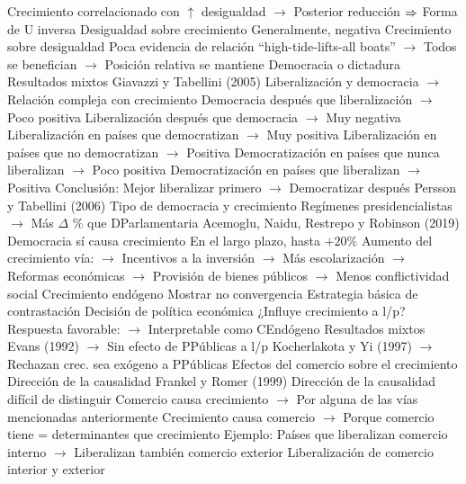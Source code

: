 \documentclass{nuevotema}
\begin{document}
\begin{esquemal}
				\4[] Crecimiento correlacionado con $\uparrow$ desigualdad
				\4[] $\to$ Posterior reducción
				\4[] $\Rightarrow$ Forma de U inversa
				\4 Desigualdad sobre crecimiento
				\4[] Generalmente, negativa
				\4 Crecimiento sobre desigualdad
				\4[] Poca evidencia de relación
				\4[] ``high-tide-lifts-all boats''
				\4[] $\to$ Todos se benefician
				\4[] $\to$ Posición relativa se mantiene
			\3 Democracia o dictadura
				\4 Resultados mixtos
				\4 Giavazzi y Tabellini (2005)
				\4[] Liberalización y democracia
				\4[] $\to$ Relación compleja con crecimiento
				\4[] Democracia después que liberalización
				\4[] $\to$ Poco positiva
				\4[] Liberalización después que democracia
				\4[] $\to$ Muy negativa
				\4[] Liberalización en países que democratizan
				\4[] $\to$ Muy positiva
				\4[] Liberalización en países que no democratizan
				\4[] $\to$ Positiva
				\4[] Democratización en países que nunca liberalizan
				\4[] $\to$ Poco positiva
				\4[] Democratización en países que liberalizan
				\4[] $\to$ Positiva
				\4[] Conclusión:
				\4[] Mejor liberalizar primero
				\4[] $\to$ Democratizar después
				\4 Persson y Tabellini (2006)
				\4[] Tipo de democracia y crecimiento
				\4[] Regímenes presidencialistas
				\4[] $\to$ Más $\Delta$ \% que DParlamentaria
				\4 Acemoglu, Naidu, Restrepo y Robinson (2019)
				\4[] Democracia sí causa crecimiento
				\4[] En el largo plazo, hasta $+20\%$
				\4[] Aumento del crecimiento vía:
				\4[] $\to$ Incentivos a la inversión
				\4[] $\to$ Más escolarización
				\4[] $\to$ Reformas económicas
				\4[] $\to$ Provisión de bienes públicos
				\4[] $\to$ Menos conflictividad social
			\3 Crecimiento endógeno
				\4 Mostrar no convergencia
				\4[] Estrategia básica de contrastación
				\4 Decisión de política económica
				\4[] ¿Influye crecimiento a l/p?
				\4[] Respuesta favorable:
				\4[] $\to$ Interpretable como CEndógeno
				\4 Resultados mixtos
				\4[] Evans (1992)
				\4[] $\to$ Sin efecto de PPúblicas a l/p
				\4[] Kocherlakota y Yi (1997)
				\4[] $\to$ Rechazan crec. sea exógeno a PPúblicas
		\2 Efectos del comercio sobre el crecimiento
			\3 Dirección de la causalidad
				\4 Frankel y Romer (1999)
				\4 Dirección de la causalidad difícil de distinguir
				\4[] Comercio causa crecimiento
				\4[] $\to$ Por alguna de las vías mencionadas anteriormente
				\4[] Crecimiento causa comercio
				\4[] $\to$ Porque comercio tiene = determinantes que crecimiento
				\4 Ejemplo:
				\4[] Países que liberalizan comercio interno
				\4[] $\to$ Liberalizan también comercio exterior
				\4[] Liberalización de comercio interior y exterior

\end{esquemal}
\end{document}
